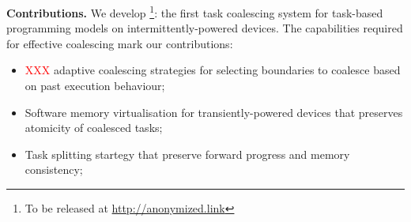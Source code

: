\textbf{Contributions.} We develop \sys\footnote{To be released at
\url{http://anonymized.link}}: the first task coalescing system for task-based
programming models on intermittently-powered devices. The capabilities required
for effective coalescing mark our contributions:

\begin{itemize}
	\item \textcolor{red}{XXX} adaptive coalescing strategies for selecting boundaries to coalesce based on past execution behaviour;
	\item Software memory virtualisation for transiently-powered devices that preserves atomicity of coalesced tasks;
	\item Task splitting startegy that preserve forward progress and memory consistency;
\end{itemize}




